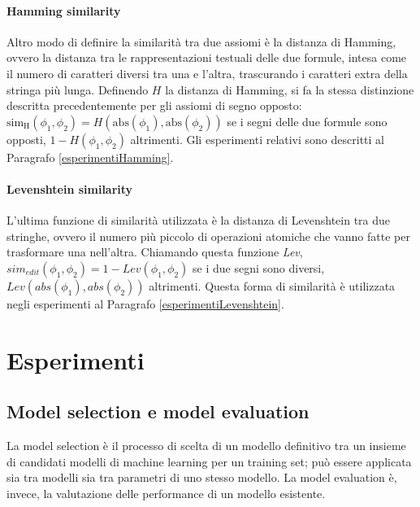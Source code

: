 \documentclass[12pt,a4paper]{report}
\begin{document}
\subsubsection{Hamming similarity}
\label{hammingSection}
Altro modo di definire la similarità tra due assiomi è la distanza di Hamming, ovvero la distanza tra le rappresentazioni testuali delle due formule, intesa come il numero di caratteri diversi tra una e l'altra, trascurando i caratteri extra della stringa più lunga.
Definendo $H$ la distanza di Hamming, si fa la stessa distinzione descritta precedentemente per gli assiomi di segno opposto:  $ \mathrm{sim_{H}}(\phi_1, \phi_2) = H(\mathrm{abs}(\phi_1),\mathrm{abs}(\phi_2))$ se i segni delle due formule sono opposti, $1 - H(\phi_1, \phi_2)$ altrimenti. Gli esperimenti relativi sono descritti al Paragrafo \ref{esperimentiHamming}.

\subsubsection{Levenshtein similarity}
\label{levenshteinSection}
L'ultima funzione di similarità utilizzata è la distanza di Levenshtein tra due stringhe, ovvero il numero più piccolo di operazioni atomiche che vanno fatte per trasformare una nell'altra. Chiamando questa funzione \emph{Lev}, $sim_{edit}(\phi_1, \phi_2) = 1 - Lev(\phi_1,\phi_2)$ se i due segni sono diversi, $Lev(abs(\phi_1),abs(\phi_2))$ altrimenti. Questa forma di similarità è utilizzata negli esperimenti al Paragrafo  \ref{esperimentiLevenshtein}.


\chapter{Esperimenti}\label{capitoloEsperimenti}

\section{Model selection e model evaluation}
La model selection è il processo di scelta di un modello definitivo tra un insieme di candidati modelli di machine learning per un training set; può essere applicata sia tra modelli sia tra parametri di uno stesso modello.
La model evaluation è, invece, la valutazione delle performance di un modello esistente.
\end{document}
